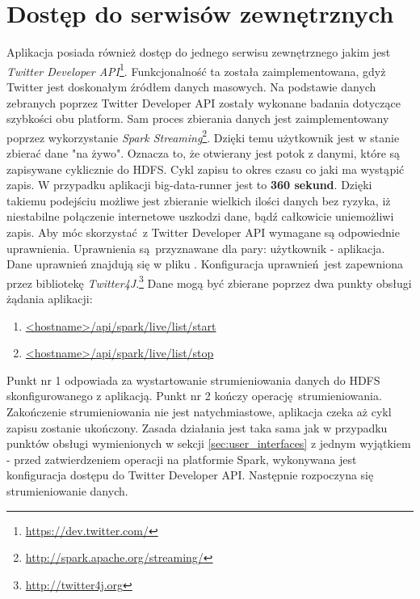 \section{Dostęp do serwisów zewnętrznych}\label{sec:twitter-api}
Aplikacja posiada również dostęp do jednego serwisu zewnętrznego jakim jest \textit{Twitter Developer API}\footnote{\url{https://dev.twitter.com/}}. Funkcjonalność ta została zaimplementowana, gdyż Twitter jest doskonałym źródłem danych masowych. Na podstawie danych zebranych poprzez Twitter Developer API zostały wykonane badania dotyczące szybkości obu platform. Sam proces zbierania danych jest zaimplementowany poprzez wykorzystanie \textit{Spark Streaming}\footnote{\url{http://spark.apache.org/streaming/}}. Dzięki temu użytkownik jest w stanie zbierać dane "na żywo". Oznacza to, że otwierany jest potok z danymi, które są zapisywane cyklicznie do HDFS. Cykl zapisu to okres czasu co jaki ma wystąpić zapis. W przypadku aplikacji big-data-runner jest to \textbf{360 sekund}. Dzięki takiemu podejściu możliwe jest zbieranie wielkich ilości danych bez ryzyka, iż niestabilne połączenie internetowe uszkodzi dane, bądź całkowicie uniemożliwi zapis. Aby móc skorzystać z Twitter Developer API wymagane są odpowiednie uprawnienia. Uprawnienia są przyznawane dla pary: użytkownik - aplikacja. Dane uprawnień znajdują się w pliku . Konfiguracja uprawnień jest zapewniona przez bibliotekę \textit{Twitter4J}.\footnote{\url{http://twitter4j.org}}
\newline Dane mogą być zbierane poprzez dwa punkty obsługi żądania aplikacji:
\begin{enumerate}
	\item{\url{<hostname>/api/spark/live/list/start}}
	\item{\url{<hostname>/api/spark/live/list/stop}}
\end{enumerate}
Punkt nr 1 odpowiada za wystartowanie strumieniowania danych do HDFS skonfigurowanego z aplikacją. Punkt nr 2 kończy operację strumieniowania. Zakończenie strumieniowania nie jest natychmiastowe, aplikacja czeka aż cykl zapisu zostanie ukończony. Zasada działania jest taka sama jak w przypadku punktów obsługi wymienionych w sekcji \ref{sec:user_interfaces} z jednym wyjątkiem - przed zatwierdzeniem operacji na platformie Spark, wykonywana jest konfiguracja dostępu do Twitter Developer API. Następnie rozpoczyna się strumieniowanie danych.
